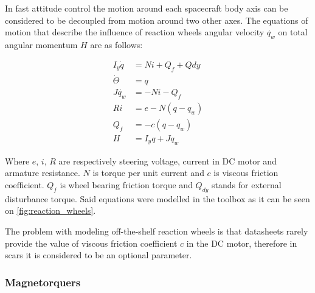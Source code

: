         In fast attitude control the motion around each spacecraft body axis can be considered to be decoupled from motion around two other axes. The equations of motion that describe the influence of reaction wheels angular velocity $\dot{q_w}$ on total angular momentum $H$ are as follows:
        
        \begin{align}
            I_y\dot{q} &= Ni+Q_f+Qdy\\
            \dot{\Theta} &= q\\
            J\dot{q_w} &= -Ni-Q_f\\
            Ri &= e - N(q-q_w)\\
            Q_f &= -c(q-q_w)\\
            H &= I_yq + Jq_w
        \end{align}

        Where $e$, $i$, $R$ are respectively steering voltage, current in DC motor and armature resistance. $N$ is torque per unit current and $c$ is viscous friction coefficient. $Q_f$ is wheel bearing friction torque and $Q_{dy}$ stands for external disturbance torque. Said equations were modelled in the toolbox as it can be seen on \autoref{fig:reaction_wheels}. 

        The problem with modeling off-the-shelf reaction wheels is that datasheets rarely provide the value of viscous friction coefficient $c$ in the DC motor, therefore in \ac{scars} it is considered to be an optional parameter. 
        
        
        



    \subsubsection{Magnetorquers}

